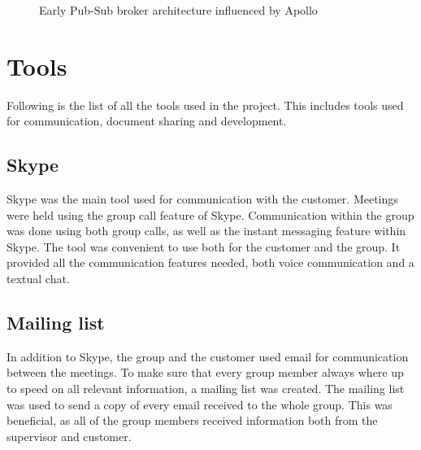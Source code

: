 \begin{center}
  \begin{figure}[ht!]
    \caption{Early Pub-Sub broker architecture influenced by Apollo}
    \label{fig:arch_proposal}
  \end{figure}
\end{center}

\section{Tools}
\label{sec:prestudies-tools}

Following is the list of all the tools used in the project. This includes tools used for communication, document sharing and development.

\subsection{Skype}
\label{subsec:prestudies-tools-skype}

Skype \cite{skype} was the main tool used for communication with the customer. Meetings were held using the group call feature of Skype. Communication within the group was done using both group calls, as well as the instant messaging feature within Skype. The tool was convenient to use both for the customer and the group. It provided all the communication features needed, both voice communication and a textual chat.

\subsection{Mailing list}
\label{subsec:prestudies-tools-mailinglist}

In addition to Skype, the group and the customer used email for communication between the meetings. To make sure that every group member always where up to speed on all relevant information, a mailing list was created. The mailing list was used to send a copy of every email received to the whole group. This was beneficial, as all of the group members received information both from the supervisor and customer.

